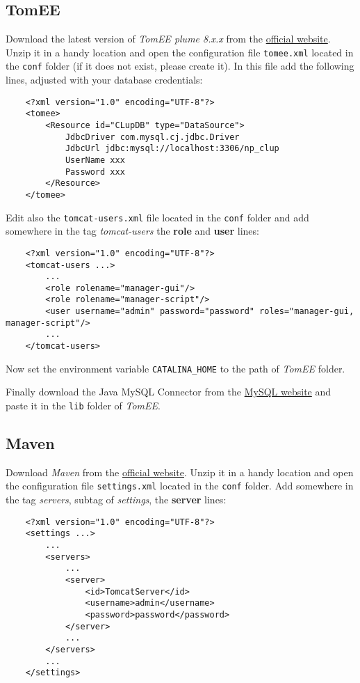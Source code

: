 \subsection{TomEE}
Download the latest version of \textit{TomEE plume 8.x.x} from the \href{https://tomee.apache.org/download-ng.html/}{official website}.\newline
Unzip it in a handy location and open the configuration file \verb|tomee.xml| located in the \verb|conf| folder (if it does not exist, please create it).\newline
In this file add the following lines, adjusted with your database credentials:


\begin{lstlisting}
	<?xml version="1.0" encoding="UTF-8"?>
	<tomee>
		<Resource id="CLupDB" type="DataSource">
			JdbcDriver com.mysql.cj.jdbc.Driver
			JdbcUrl jdbc:mysql://localhost:3306/np_clup
			UserName xxx
			Password xxx
		</Resource>
	</tomee>
\end{lstlisting}

Edit also the \verb|tomcat-users.xml| file located in the \verb|conf| folder and add somewhere in the tag \textit{tomcat-users} the \textbf{role} and \textbf{user} lines:
\begin{lstlisting}
	<?xml version="1.0" encoding="UTF-8"?>
	<tomcat-users ...>
		...
		<role rolename="manager-gui"/>
		<role rolename="manager-script"/>
		<user username="admin" password="password" roles="manager-gui, manager-script"/>
		...
	</tomcat-users>
\end{lstlisting}

Now set the environment variable \verb|CATALINA_HOME| to the path of \textit{TomEE} folder.

Finally download the Java MySQL Connector from the \href{https://dev.mysql.com/downloads/connector/j/}{MySQL website} and paste it in the \verb|lib| folder of \textit{TomEE}.

\subsection{Maven}
Download \textit{Maven} from the \href{https://maven.apache.org/download.cgi}{official website}.\newline
Unzip it in a handy location and open the configuration file \verb|settings.xml| located in the \verb|conf| folder.
Add somewhere in the tag \textit{servers}, subtag of \textit{settings}, the \textbf{server} lines:
\begin{lstlisting}
	<?xml version="1.0" encoding="UTF-8"?>
	<settings ...>
		...
		<servers>
			...
			<server>
				<id>TomcatServer</id>
				<username>admin</username>
				<password>password</password>
			</server>
			...
		</servers>
		...
	</settings>
\end{lstlisting}

